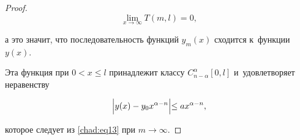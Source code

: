 \begin{proof}


$$\lim_{x \to \infty}T(m, l)=0, $$


а это значит,  что последовательность функций $y_m(x)$ сходится к~функции $y(x)$. 

Эта функция при $0<x\leq l$ принадлежит классу $C_{n-\alpha}^\alpha[0, l]$ и~удовлетворяет неравенству

\begin{equation*}


\Bigl|y(x)-y_0x^{\alpha-n}\Bigl|\leq ax^{\alpha-n}, 

\end{equation*}

которое следует из \eqref{chad:eq13} при $m\rightarrow \infty$.

%


















\end{proof}



